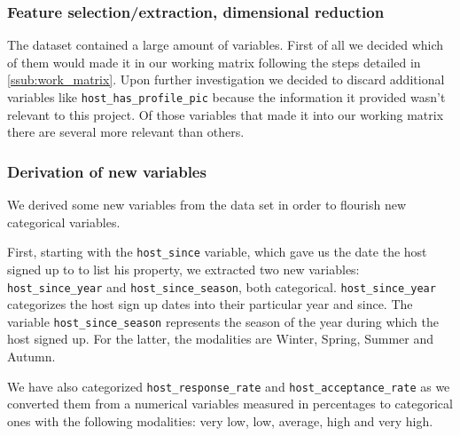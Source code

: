 \subsubsection{Feature selection/extraction, dimensional reduction}

The \airbnb dataset contained a large amount of variables. First of all we
decided which of them would made it in our working matrix following the steps
detailed in \ref{ssub:work_matrix}. Upon further investigation we decided to
discard additional variables like \texttt{host\_has\_profile\_pic} because the
information it provided wasn't relevant to this project. Of those variables that
made it into our working matrix there are several more relevant than others.

\begin{comment} %

\subsubsection{Instance selection}

\subsubsection{Data transformation}

\end{comment}

\subsubsection{Derivation of new variables}

We derived some new variables from the data set in order to flourish new
categorical variables.

First, starting with the \texttt{host\_since} variable, which gave us the date
the host signed up to \airbnb to list his property, we extracted two new
variables: \texttt{host\_since\_year} and \texttt{host\_since\_season}, both
categorical. \texttt{host\_since\_year} categorizes the host sign up dates into
their particular year and since. The variable \texttt{host\_since\_season}
represents the season of the year during which the host signed up. For the
latter, the modalities are Winter, Spring, Summer and Autumn.

We have also categorized \texttt{host\_response\_rate} and
\texttt{host\_acceptance\_rate} as we converted them from a numerical variables
measured in percentages to categorical ones with the following modalities: very
low, low, average, high and very high.

